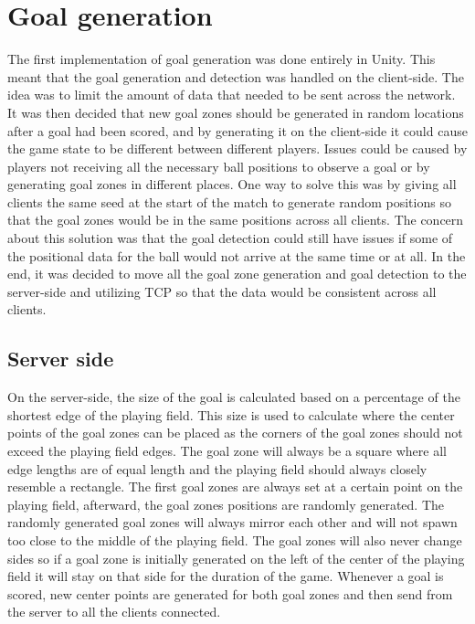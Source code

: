 \section{Goal generation}\label{subsec:goalrefactoring}
The first implementation of goal generation was done entirely in Unity.
This meant that the goal generation and detection was handled on the client-side.
The idea was to limit the amount of data that needed to be sent across the network.
It was then decided that new goal zones should be generated in random locations after a goal had been scored, and by generating it on the client-side it could cause the game state to be different between different players.
Issues could be caused by players not receiving all the necessary ball positions to observe a goal or by generating goal zones in different places.
One way to solve this was by giving all clients the same seed at the start of the match to generate random positions so that the goal zones would be in the same positions across all clients.
The concern about this solution was that the goal detection could still have issues if some of the positional data for the ball would not arrive at the same time or at all.
In the end, it was decided to move all the goal zone generation and goal detection to the server-side and utilizing TCP so that the data would be consistent across all clients.

\subsection{Server side}
On the server-side, the size of the goal is calculated based on a percentage of the shortest edge of the playing field.
This size is used to calculate where the center points of the goal zones can be placed as the corners of the goal zones should not exceed the playing field edges.
The goal zone will always be a square where all edge lengths are of equal length and the playing field should always closely resemble a rectangle.
The first goal zones are always set at a certain point on the playing field, afterward, the goal zones positions are randomly generated.
The randomly generated goal zones will always mirror each other and will not spawn too close to the middle of the playing field.
The goal zones will also never change sides so if a goal zone is initially generated on the left of the center of the playing field it will stay on that side for the duration of the game.
Whenever a goal is scored, new center points are generated for both goal zones and then send from the server to all the clients connected.

